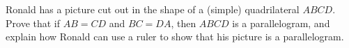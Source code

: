 Ronald has a picture cut out in the shape of a (simple) quadrilateral $ABCD$. Prove that if $AB=CD$ and $BC=DA$, then $ABCD$ is a parallelogram, and explain how Ronald can use a ruler to show that his picture is a parallelogram.
